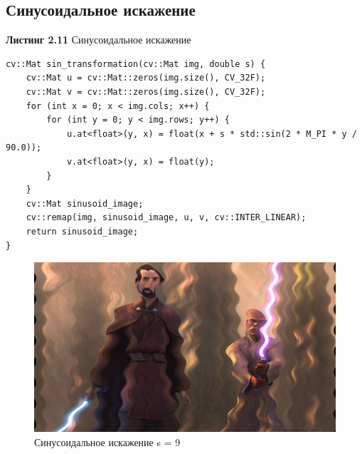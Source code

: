 \subsection{Синусоидальное искажение}
\noindent \textbf{Листинг 2.11} Синусоидальное искажение
\begin{lstlisting}
cv::Mat sin_transformation(cv::Mat img, double s) {
    cv::Mat u = cv::Mat::zeros(img.size(), CV_32F);
    cv::Mat v = cv::Mat::zeros(img.size(), CV_32F);
    for (int x = 0; x < img.cols; x++) {
        for (int y = 0; y < img.rows; y++) {
            u.at<float>(y, x) = float(x + s * std::sin(2 * M_PI * y / 90.0));
            v.at<float>(y, x) = float(y);
        }
    }
    cv::Mat sinusoid_image;
    cv::remap(img, sinusoid_image, u, v, cv::INTER_LINEAR);
    return sinusoid_image;
}

\end{lstlisting}
\begin{figure}[h]
    \centering
    \includegraphics[scale=0.3]{"../images/results/sinusoidal_distortion_img.jpg"}
    \caption{Синусоидальное искажение s = 9}
\end{figure}

\newpage


